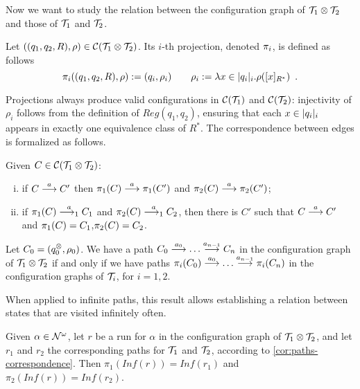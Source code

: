 %
Now we want to study the relation between the configuration graph of $\mathcal{T}_1 \otimes \mathcal{T}_2$ and those of $\mathcal{T}_1$ and $\mathcal{T}_2$. 

\begin{definition}
Let $((q_1,q_2,R),\rho) \in \mathcal{C}(\mathcal{T}_1 \otimes \mathcal{T}_2)$. Its $i$-th projection, denoted $\pi_i$, is defined as follows
\[
	\pi_i((q_1,q_2,R),\rho) := (q_i,\rho_i) \qquad \rho_i := \lambda x \in |q_i|_i.\rho([x]_{R^*}) \enspace .
\]
\end{definition}
%
%
%
Projections always produce valid configurations in $\mathcal{C}(\mathcal{T}_1)$ and $\mathcal{C}(\mathcal{T}_2)$: injectivity of $\rho_i$ follows from the definition of $Reg(q_1,q_2)$, ensuring that each $x \in |q_i|_i$ appears in exactly one equivalence class of $R^*$. The correspondence between edges is formalized as follows.

\begin{proposition}
\label{prop:edges-correspondence}
Given $C \in \mathcal{C}(\mathcal{T}_1 \otimes \mathcal{T}_2)$:
\begin{enumerate}[(i)]
	\item if $C \overset{a}{\longrightarrow} C'$ then $\pi_1(C) \overset{a}{\longrightarrow} \pi_1(C')$ and $\pi_2(C) \overset{a}{\longrightarrow} \pi_2(C')$;
	\label{sync-to-each}
	\item if $\pi_1(C) \overset{a}{\longrightarrow_{1}} C_1$ and $\pi_2(C) \overset{a}{\longrightarrow_{1}} C_2$, then there is $C'$ such that $C\overset{a}{\longrightarrow} C'$ and $\pi_1(C) = C_1$,$\pi_2(C) = C_2$.
	\label{each-to-sync}
\end{enumerate}
\end{proposition}
%
\begin{corollary}
\label{cor:paths-correspondence}
Let $C_0 = (q_0^{\otimes},\rho_0)$. We have a path $C_0 \overset{a_0}{\longrightarrow} \dots \overset{a_{n-1}}{\longrightarrow} C_n$ in the configuration graph of $\mathcal{T}_1 \otimes \mathcal{T}_2$ if and only if we have paths $\pi_i(C_0) \overset{a_0}{\longrightarrow} \dots \overset{a_{n-1}}{\longrightarrow} \pi_i(C_n)$ in the configuration graphs of $\mathcal{T}_i$, for $i=1,2$.
\end{corollary}
%
When applied to infinite paths, this result allows establishing a relation between states that are visited infinitely often.
%
\begin{theorem}
\label{thm:inf-correspondence}
Given $\alpha \in \mathcal{N}^\omega$, let $r$ be a run for $\alpha$ in the configuration graph of $\mathcal{T}_1 \otimes \mathcal{T}_2$, and let $r_1$ and $r_2$ the corresponding paths for $\mathcal{T}_1$ and $\mathcal{T}_2$, according to \cref{cor:paths-correspondence}. Then $\pi_1(Inf(r)) = Inf(r_1)$ and $\pi_2(Inf(r)) = Inf(r_2)$.
\end{theorem}
%

